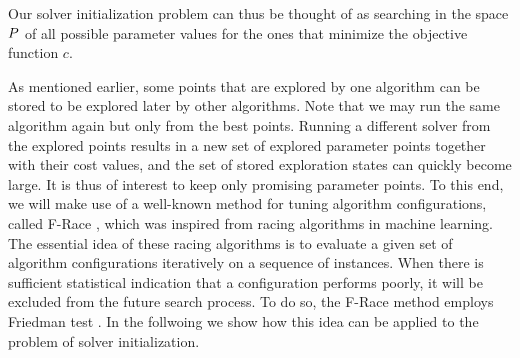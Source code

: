 Our solver initialization problem can thus be thought of as searching in the space $P$ of all possible parameter values for the ones that minimize the objective function $c$. 


As mentioned earlier, some points that are explored by one algorithm can be stored to be explored later by other algorithms. Note that we may run the same algorithm again but only from the best points. Running a different solver from the explored points results in a new set of explored parameter points together with their cost values, and the set of stored exploration states can quickly become large. It is thus of interest to keep only promising parameter points. To this end, we will make use of a well-known method for tuning algorithm configurations, called F-Race \cite{FRace2010}, which was inspired from racing algorithms in machine learning. The essential idea of these racing algorithms is to evaluate a given set of algorithm configurations iteratively on a sequence of instances. When there is sufficient statistical indication that a configuration performs poorly, it will be excluded from the future search process. To do so, the F-Race method employs Friedman test \cite{Conover1999}. 
In the follwoing we show how this idea can be applied to the problem of solver initialization.


